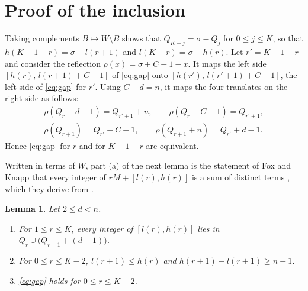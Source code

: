 \documentclass[11pt]{article}
\newtheorem{lemma}[theorem]{Lemma}
\theoremstyle{remark}
\begin{document}
\section{Proof of the inclusion}\label{sec:reflect}

Taking complements $B\mapsto W\setminus B$ shows that $Q_{K-j}=\sigma-Q_j$ for
$0\le j\le K$, so that $h(K-1-r)=\sigma-l(r+1)$ and $l(K-r)=\sigma-h(r)$. Let $r'=K-1-r$ and consider the reflection
$\rho(x)=\sigma+C-1-x$. It maps the left side $[h(r),\,l(r+1)+C-1]$ of \eqref{eq:gap} onto
$[h(r'),\,l(r'+1)+C-1]$, the left side of \eqref{eq:gap} for $r'$. Using $C-d=n$, it maps the four translates on the
right side as follows:
\begin{gather*}
\rho(Q_r+d-1)=Q_{r'+1}+n,\qquad \rho(Q_r+C-1)=Q_{r'+1},\\
\rho(Q_{r+1})=Q_{r'}+C-1,\qquad \rho(Q_{r+1}+n)=Q_{r'}+d-1.
\end{gather*}
Hence \eqref{eq:gap} for $r$ and for $K-1-r$ are equivalent.

Written in terms of $W$, part (a) of the next lemma is the statement of Fox and Knapp that every integer of
$rM+[l(r),h(r)]$ is a sum of distinct terms \cite[Section~3, p.~10]{FK}, which they derive from \cite[Lemma~2]{FK}.

\begin{lemma}\label{lem:Cm}
Let $2\le d<n$.
\begin{enumerate}[label=(\alph*)]
\item For $1\le r\le K$, every integer of $[l(r),h(r)]$ lies in $Q_r\cup\bigl(Q_{r-1}+(d-1)\bigr)$.
\item For $0\le r\le K-2$, $l(r+1)\le h(r)$ and $h(r+1)-l(r+1)\ge n-1$.
\item \eqref{eq:gap} holds for $0\le r\le K-2$.
\end{enumerate}
\end{lemma}
\end{document}
